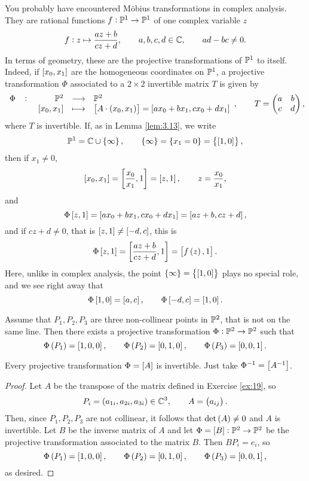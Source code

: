 \pagebreak

\begin{example}
\label{eg:8.4}
You probably have encountered M\"obius transformations in complex analysis. They are rational functions $ f : \P^1 \to \P^1 $ of one complex variable $ z $
$$ f : z \mapsto \dfrac{az + b}{cz + d}, \qquad a, b, c, d \in \C, \qquad ad - bc \ne 0. $$
In terms of geometry, these are the projective transformations of $ \P^1 $ to itself. Indeed, if $ \sbr{x_0, x_1} $ are the homogeneous coordinates on $ \P^1 $, a projective transformation $ \Phi $ associated to a $ 2 \times 2 $ invertible matrix $ T $ is given by
$$ \function[\Phi]{\P^2}{\P^2}{\sbr{x_0, x_1}}{\sbr{A \cdot \br{x_0, x_1}} = \sbr{ax_0 + bx_1, cx_0 + dx_1}}, \qquad T = \twobytwo{a}{b}{c}{d}, $$
where $ T $ is invertible. If, as in Lemma \ref{lem:3.13}, we write
$$ \P^1 = \C \cup \cbr{\infty}, \qquad \cbr{\infty} = \cbr{x_1 = 0} = \cbr{\sbr{1, 0}}, $$
then if $ x_1 \ne 0 $,
$$ \sbr{x_0, x_1} = \sbr{\dfrac{x_0}{x_1}, 1} = \sbr{z, 1}, \qquad z = \dfrac{x_0}{x_1}, $$
and
$$ \Phi\sbr{z, 1} = \sbr{ax_0 + bx_1, cx_0 + dx_1} = \sbr{az + b, cz + d}, $$
and if $ cz + d \ne 0 $, that is $ \sbr{z, 1} \ne \sbr{-d, c} $, this is
$$ \Phi\sbr{z, 1} = \sbr{\dfrac{az + b}{cz + d}, 1} = \sbr{f\br{z}, 1}. $$
Here, unlike in complex analysis, the point $ \cbr{\infty} = \cbr{\sbr{1, 0}} $ plays no special role, and we see right away that
$$ \Phi\sbr{1, 0} = \sbr{a, c}, \qquad \Phi\sbr{-d, c} = \sbr{1, 0}. $$
\end{example}

\begin{theorem}
\label{thm:8.5}
Assume that $ P_1, P_2, P_3 $ are three non-collinear points in $ \P^2 $, that is not on the same line. Then there exists a projective transformation $ \Phi : \P^2 \to \P^2 $ such that
$$ \Phi\br{P_1} = \sbr{1, 0, 0}, \qquad \Phi\br{P_2} = \sbr{0, 1, 0}, \qquad \Phi\br{P_3} = \sbr{0, 0, 1}. $$
\end{theorem}

\begin{remark*}
Every projective transformation $ \Phi = \sbr{A} $ is invertible. Just take $ \Phi^{-1} = \sbr{A^{-1}} $.
\end{remark*}

\begin{proof}
Let $ A $ be the transpose of the matrix defined in Exercise \ref{ex:19}, so
$$ P_i = \br{a_{1i}, a_{2i}, a_{3i}} \in \C^3, \qquad A = \br{a_{ij}}. $$
Then, since $ P_1, P_2, P_3 $ are not collinear, it follows that $ \det\br{A} \ne 0 $ and $ A $ is invertible. Let $ B $ be the inverse matrix of $ A $ and let $ \Phi = \sbr{B} : \P^2 \to \P^2 $ be the projective transformation associated to the matrix $ B $. Then $ BP_i = e_i $, so
$$ \Phi\br{P_1} = \sbr{1, 0, 0}, \qquad \Phi\br{P_2} = \sbr{0, 1, 0}, \qquad \Phi\br{P_3} = \sbr{0, 0, 1}, $$
as desired.
\end{proof}

